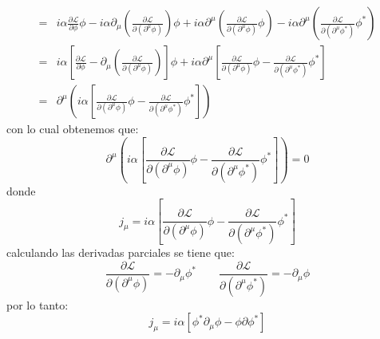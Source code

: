 \begin{itemize}
\begin{align*}
        =& i\alpha \frac{\partial \mathcal{L}}{\partial \phi } \phi -i\alpha \partial_\mu \left(\frac{\partial \mathcal{L}}{\partial (\partial^\mu \phi)}\right) \phi + i\alpha \partial^\mu \left( \frac{\partial \mathcal{L}}{\partial (\partial^\mu \phi)} \phi \right) - i\alpha\partial^\mu \left( \frac{\partial \mathcal{L}}{\partial (\partial^\mu {\phi}^*)} {\phi}^* \right) \\
        =& i\alpha \left[ \frac{\partial \mathcal{L}}{\partial \phi} - \partial_\mu \left(\frac{\partial \mathcal{L}}{\partial (\partial^\mu \phi)}\right) \right] \phi + i\alpha \partial^\mu \left[ \frac{\partial \mathcal{L}}{\partial (\partial^\mu \phi)} \phi  - \frac{\partial \mathcal{L}}{\partial (\partial^\mu {\phi}^*)} {\phi}^* \right]\\
        =& \partial^\mu \left(i\alpha\left[ \frac{\partial \mathcal{L}}{\partial (\partial^\mu \phi)} \phi  - \frac{\partial \mathcal{L}}{\partial (\partial^\mu {\phi}^*)} {\phi}^* \right]\right)
    \end{align*}
    con lo cual obtenemos que:
    \begin{equation*}
        \partial^\mu \left(i\alpha\left[ \frac{\partial \mathcal{L}}{\partial (\partial^\mu \phi)} \phi  - \frac{\partial \mathcal{L}}{\partial (\partial^\mu {\phi}^*)} {\phi}^* \right]\right) = 0
    \end{equation*}
    donde 
     \begin{equation*}
         j_\mu = i\alpha\left[ \frac{\partial \mathcal{L}}{\partial (\partial^\mu \phi)} \phi  - \frac{\partial \mathcal{L}}{\partial (\partial^\mu {\phi}^*)} {\phi}^* \right]
     \end{equation*}
     calculando las derivadas parciales se tiene que:
     \begin{equation*}
        \frac{\partial \mathcal{L}}{\partial (\partial^\mu \phi)} = -\partial_\mu \phi^* \qquad \frac{\partial \mathcal{L}}{\partial (\partial^\mu \phi^*)} = -\partial_\mu \phi
     \end{equation*}
     por lo tanto:
     \begin{equation*}
         j_\mu = i\alpha \left[\phi^* \partial_\mu \phi - \phi \partial \phi^* \right]
     \end{equation*}
\end{itemize}